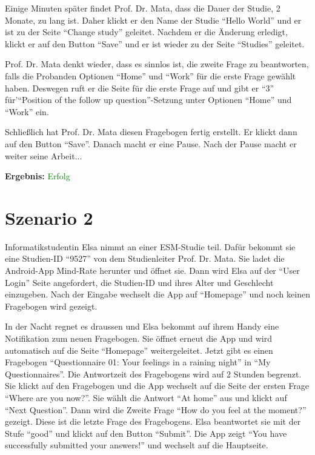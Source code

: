 \documentclass[a4paper]{scrreprt}
\begin{document}
                \par Einige Minuten sp\"ater findet Prof. Dr. Mata, dass die Dauer der Studie, 2 Monate,  zu lang ist. Daher klickt er den Name der Studie ``Hello World'' und er ist zu der Seite ``Change study'' geleitet. Nachdem er die \"Anderung erledigt, klickt er auf den Button ``Save'' und er ist wieder zu der Seite ``Studies'' geleitet.
                
                \par Prof. Dr. Mata denkt wieder, dass es sinnlos ist, die zweite Frage zu beantworten, falls die Probanden Optionen ``Home'' und ``Work'' f\"ur die erste Frage gew\"ahlt haben. Deswegen ruft er die Seite f\"ur die erste Frage auf und gibt er ``3'' f\"ur'``Position of the follow up question''-Setzung unter Optionen ``Home'' und ``Work'' ein.
                
                \par Schließlich hat Prof. Dr. Mata diesen Fragebogen fertig erstellt. Er klickt dann auf den Button ``Save''. Danach macht er eine Pause. Nach der Pause macht er weiter seine Arbeit... 
		      		           \vspace*{0.3cm}
		      		           \par \textbf{Ergebnis: }\textcolor{green}{Erfolg}
		      		           \vspace*{0.6cm}                  
                

            \section{Szenario 2}
	            \par Informatikstudentin Elsa nimmt an einer ESM-Studie teil. Dafür bekommt sie eine Studien-ID ``9527'' von dem Studienleiter Prof. Dr. Mata. Sie ladet die Android-App Mind-Rate herunter und \"offnet sie. Dann wird Elsa auf der ``User Login'' Seite angefordert, die Studien-ID und ihres Alter und Geschlecht einzugeben. Nach der Eingabe wechselt die App auf ``Homepage'' und noch keinen Fragebogen wird gezeigt.

	            \par In der Nacht regnet es draussen und Elsa bekommt auf ihrem Handy eine Notifikation zum neuen Fragebogen. Sie \"offnet erneut die App und wird automatisch auf die Seite ``Homepage'' weitergeleitet. Jetzt gibt es einen Fragebogen ``Questionnaire 01: Your feelings in a raining night'' in ``My Questionnaires''. Die Antwortzeit des Fragebogens wird auf 2 Stunden begrenzt. Sie klickt auf den Fragebogen und die App wechselt auf die Seite der ersten Frage ``Where are you now?''. Sie w\"ahlt die Antwort ``At home'' aus und klickt auf ``Next Question''. Dann wird die Zweite Frage ``How do you feel at the moment?'' gezeigt. Diese ist die letzte Frage des Fragebogens. Elsa beantwortet sie mit der Stufe ``good'' und klickt auf den Button ``Submit''. Die App zeigt “You have successfully submitted your answers!” und wechselt auf die Hauptseite.
\end{document}
